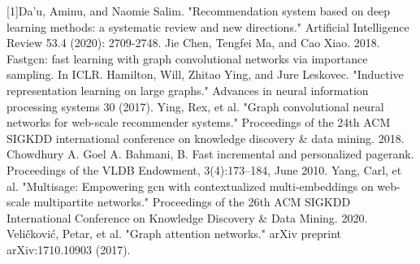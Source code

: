 [1]Da’u, Aminu, and Naomie Salim. "Recommendation system based on deep learning methods: a systematic review and new directions." Artificial Intelligence Review 53.4 (2020): 2709-2748.
\newline[2]Jie Chen, Tengfei Ma, and Cao Xiao. 2018. Fastgcn: fast learning with graph convolutional networks via importance sampling. In ICLR.
\newline[3] Hamilton, Will, Zhitao Ying, and Jure Leskovec. "Inductive representation learning on large graphs." Advances in neural information processing systems 30 (2017).
\newline[4] Ying, Rex, et al. "Graph convolutional neural networks for web-scale recommender systems." Proceedings of the 24th ACM SIGKDD international conference on knowledge discovery & data mining. 2018.
\newline[5] Chowdhury A. Goel A. Bahmani, B. Fast incremental and personalized pagerank. Proceedings of the VLDB Endowment, 3(4):173–184, June 2010. 
\newline[6]Yang, Carl, et al. "Multisage: Empowering gcn with contextualized multi-embeddings on web-scale multipartite networks." Proceedings of the 26th ACM SIGKDD International Conference on Knowledge Discovery & Data Mining. 2020.
\newline[7] Veličković, Petar, et al. "Graph attention networks." arXiv preprint arXiv:1710.10903 (2017).